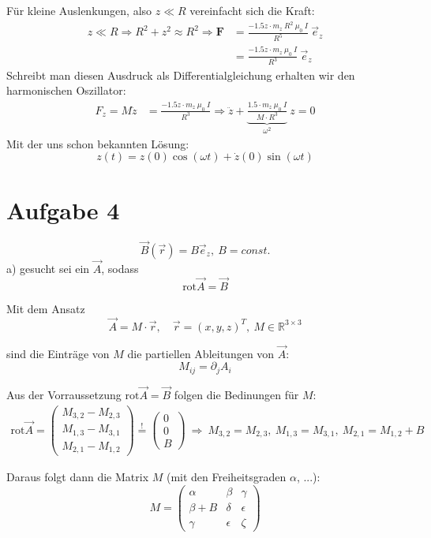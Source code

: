 \documentclass[11pt a4paper]{article}
\newcommand{\rot}{\text{rot}}
\begin{document}
Für kleine Auslenkungen, also $z \ll R$ vereinfacht sich die Kraft:
\begin{align*}
	z \ll R \Rightarrow R^2 + z^2 \approx R^2 \Rightarrow
	\mathbf F
	&= \frac{-1.5 z \cdot m_z \ R^2 \ \mu_0 \ I}
	{R^5} \ \vec e_z \\
	&= \frac{-1.5 z \cdot m_z \ \mu_0 \ I}
	{R^3} \ \vec e_z
\end{align*}
Schreibt man diesen Ausdruck als Differentialgleichung erhalten wir den
harmonischen Oszillator:
\begin{align*}
	F_z = M\ddot z 
	&= \frac{-1.5 z \cdot m_z \ \mu_0 \ I}
	{R^3} \Rightarrow
	\ddot z + \underbrace{\frac{1.5\cdot m_z \ \mu_0 \ I}{M \cdot R^3}}
	_{\omega^2} \ z = 0
\end{align*}
Mit der uns schon bekannten Lösung:
\[
	z(t) = z(0) \cos(\omega t) + \dot z(0) \sin(\omega t)
\]

\newpage
\section*{Aufgabe 4}
\[
	\vec B(\vec r) = B \vec e_z, \ B = const. \tag{4.1}
\]
a) gesucht sei ein $\vec A$, sodass
\[ \rot \vec A = \vec B \]

Mit dem Ansatz 
\[
	\vec A = M \cdot \vec r, \quad
	\vec r = (x,y,z)^T, \
	M \in \mathbb{R}^{3\times3}
\]

sind die Einträge von $M$ die partiellen Ableitungen von $\vec A$:
\[ M_{ij} = \partial_j A_i \tag{4.2} \]

Aus der Vorraussetzung $\rot \vec A =\vec B$ folgen die Bedinungen für 
$M$:
\begin{align*}
	\rot \vec A = \begin{pmatrix}
		M_{3,2} - M_{2,3} \\
		M_{1,3} - M_{3,1} \\
		M_{2,1} - M_{1,2} 
	\end{pmatrix}
	\overset{!}{=}
	\begin{pmatrix} 0 \\ 0 \\ B \end{pmatrix}
	\ \Rightarrow \
	M_{3,2} = M_{2,3}, \
	M_{1,3} = M_{3,1}, \
	M_{2,1} = M_{1,2} +B
	\tag{4.3}
\end{align*}

Daraus folgt dann die Matrix $M$ (mit den Freiheitsgraden $\alpha$, ...):
\[
	M = \begin{pmatrix}
		\alpha 		&\beta 		&\gamma \\
		\beta + B 	&\delta 	&\epsilon \\
		\gamma 		&\epsilon 	&\zeta
	\end{pmatrix}
\]
\end{document}
